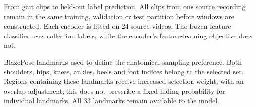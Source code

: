 \caption{From gait clips to held-out label prediction. All clips from one source recording remain in the same training, validation or test partition before windows are constructed. Each encoder is fitted on 24 source videos. The frozen-feature classifier uses collection labels, while the encoder's feature-learning objective does not.}

\caption{BlazePose landmarks used to define the anatomical sampling preference. Both shoulders, hips, knees, ankles, heels and foot indices belong to the selected set. Regions containing these landmarks receive increased selection weight, with an overlap adjustment; this does not prescribe a fixed hiding probability for individual landmarks. All 33 landmarks remain available to the model.}
